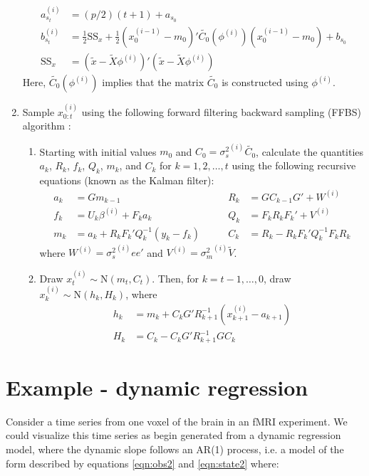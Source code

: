 \documentclass{article}
\begin{document}
\begin{enumerate}
\begin{align*}
a_{s_t}^{(i)} &= (p/2)(t+1) + a_{s_0} \\
b_{s_t}^{(i)} &= \frac{1}{2}\mbox{SS}_x + \frac{1}{2}(x_0^{(i-1)}-m_0)'\tilde{C_0}(\phi^{(i)})(x_0^{(i-1)}-m_0) + b_{s_0} \\
\mbox{SS}_x &= (\tilde{x} - \tilde{X}\phi^{(i)})'(\tilde{x} - \tilde{X}\phi^{(i)})
\end{align*}
\noindent Here, $\tilde{C_0}(\phi^{(i)})$ implies that the matrix $\tilde{C_0}$ is constructed using $\phi^{(i)}$.
\item Sample $x_{0:t}^{(i)}$ using the following forward filtering backward sampling (FFBS) algorithm \citep{petris2009dynamic}:
\begin{enumerate}
\item Starting with initial values $m_0$ and $C_0 = {\sigma^2_s}^{(i)}\tilde{C_0}$, calculate the quantities $a_k$, $R_k$, $f_k$, $Q_k$, $m_k$, and $C_k$ for $k = 1,2,\ldots,t$ using the following recursive equations (known as the Kalman filter):
    \begin{align*}
    a_k &= Gm_{k-1} &\qquad R_k &= GC_{k-1}G' + W^{(i)} \\
    f_k &= U_k\beta^{(i)} + F_ka_k &\qquad Q_k &= F_kR_kF_k' + V^{(i)} \\
    m_k &= a_k + R_kF_k'Q_k^{-1}(y_k-f_k) &\qquad C_k &= R_k - R_kF_k'Q_k^{-1}F_kR_k
    \end{align*}
    \noindent where $W^{(i)} = {\sigma^2_s}^{(i)}ee'$ and $V^{(i)} = {\sigma^2_m}^{(i)}\tilde{V}$.
\item Draw $x_t^{(i)} \sim \mbox{N}(m_t,C_t)$. Then, for $k = t-1,\ldots,0$, draw $x_k^{(i)} \sim \mbox{N}(h_k,H_k)$, where
    \begin{align*}
    h_k &= m_k + C_kG'R_{k+1}^{-1}(x_{k+1}^{(i)} - a_{k+1}) \\
    H_k &= C_k - C_kG'R_{k+1}^{-1}GC_k
    \end{align*}
\end{enumerate}
\end{enumerate}

\section{Example - dynamic regression} \label{sec:exdr}

Consider a time series from one voxel of the brain in an fMRI experiment. We could visualize this time series as begin generated from a dynamic regression model, where the dynamic slope follows an AR(1) process, i.e. a model of the form described by equations \eqref{eqn:obs2} and \eqref{eqn:state2} where:
\end{document}

